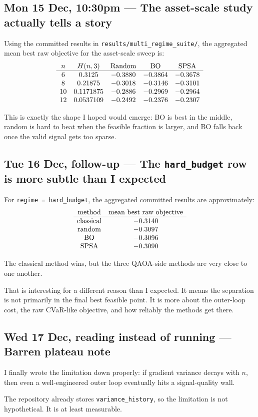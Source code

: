\documentclass[11pt]{article}
\newcommand{\entry}[2]{\subsection*{#1 --- #2}}
\newcommand{\repo}[1]{\texttt{#1}}
\begin{document}
\entry{Mon 15 Dec, 10:30pm}{The asset-scale study actually tells a story}

Using the committed results in \repo{results/multi\_regime\_suite/}, the aggregated mean best raw
objective for the asset-scale sweep is:
\[
\begin{array}{c c c c c}
n & H(n,3) & \text{Random} & \text{BO} & \text{SPSA} \\
\hline
6  & 0.3125    & -0.3880 & -0.3864 & -0.3678 \\
8  & 0.21875   & -0.3018 & -0.3146 & -0.3101 \\
10 & 0.1171875 & -0.2886 & -0.2969 & -0.2964 \\
12 & 0.0537109 & -0.2492 & -0.2376 & -0.2307
\end{array}
\]

This is exactly the shape I hoped would emerge:
BO is best in the middle, random is hard to beat when the feasible fraction is larger, and BO
falls back once the valid signal gets too sparse.

\entry{Tue 16 Dec, follow-up}{The \repo{hard\_budget} row is more subtle than I expected}

For \repo{regime = hard\_budget}, the aggregated committed results are approximately:
\[
\begin{array}{c c}
\text{method} & \text{mean best raw objective} \\
\hline
\text{classical} & -0.3140 \\
\text{random} & -0.3097 \\
\text{BO} & -0.3096 \\
\text{SPSA} & -0.3090
\end{array}
\]

The classical method wins, but the three QAOA-side methods are very close to one another.

That is interesting for a different reason than I expected.
It means the separation is not primarily in the final best feasible point. It is more about the
outer-loop cost, the raw CVaR-like objective, and how reliably the methods get there.

\entry{Wed 17 Dec, reading instead of running}{Barren plateau note}

I finally wrote the limitation down properly:
if gradient variance decays with \(n\), then even a well-engineered outer loop eventually hits a
signal-quality wall.

The repository already stores \repo{variance\_history}, so the limitation is not hypothetical.
It is at least measurable.
\end{document}
